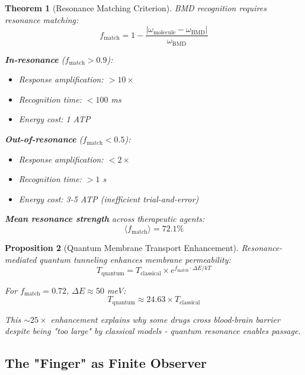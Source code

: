 \documentclass[11pt,a4paper]{article}
\newtheorem{theorem}{Theorem}[section]
\newtheorem{proposition}[theorem]{Proposition}
\theoremstyle{definition}
\theoremstyle{remark}
\begin{document}
\begin{theorem}[Resonance Matching Criterion]
BMD recognition requires resonance matching:
\begin{equation}
f_{\text{match}} = 1 - \frac{|\omega_{\text{molecule}} - \omega_{\text{BMD}}|}{\omega_{\text{BMD}}}
\end{equation}

\textbf{In-resonance} ($f_{\text{match}} > 0.9$):
\begin{itemize}
\item Response amplification: $> 10\times$
\item Recognition time: $< 100$ ms
\item Energy cost: 1 ATP
\end{itemize}

\textbf{Out-of-resonance} ($f_{\text{match}} < 0.5$):
\begin{itemize}
\item Response amplification: $< 2\times$
\item Recognition time: $> 1$ s
\item Energy cost: 3-5 ATP (inefficient trial-and-error)
\end{itemize}

\textbf{Mean resonance strength} across therapeutic agents:
\begin{equation}
\langle f_{\text{match}} \rangle = 72.1\%
\end{equation}
\end{theorem}

\begin{proposition}[Quantum Membrane Transport Enhancement]
Resonance-mediated quantum tunneling enhances membrane permeability:
\begin{equation}
T_{\text{quantum}} = T_{\text{classical}} \times e^{f_{\text{match}} \cdot \Delta E / kT}
\end{equation}

For $f_{\text{match}} = 0.72$, $\Delta E \approx 50$ meV:
\begin{equation}
T_{\text{quantum}} \approx 24.63 \times T_{\text{classical}}
\end{equation}

This $\sim 25\times$ enhancement explains why some drugs cross blood-brain barrier despite being "too large" by classical models - quantum resonance enables passage.
\end{proposition}

\subsection{The "Finger" as Finite Observer}
\end{document}

